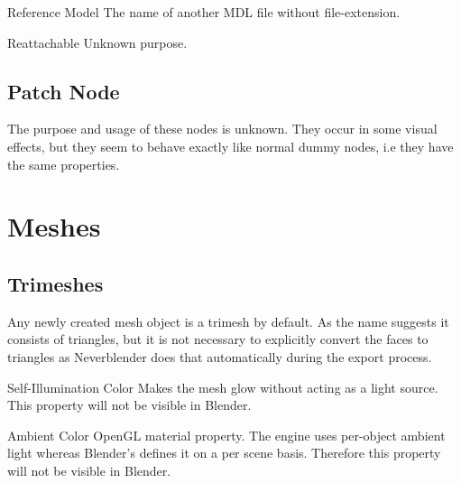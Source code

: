 \begin{propertyAurora}{Reference Model}
The name of another MDL file without file-extension.
\end{propertyAurora}

\begin{propertyAurora}{Reattachable}
Unknown purpose.
\end{propertyAurora}

\subsection{Patch Node}
The purpose and usage of these nodes is unknown. They occur in some visual effects, but
they seem to behave exactly like normal dummy nodes, i.e they have the same
properties.

\section{Meshes}

\subsection{Trimeshes}

\begin{minipage}[t]{0.65\textwidth}
    Any newly created mesh object is a trimesh by default. As the name 
    suggests it consists of triangles, but it is not necessary to explicitly 
    convert the faces to triangles as Neverblender does that automatically 
    during the export process.
\end{minipage}\hfill
\begin{minipage}[t]{0.3\textwidth}
    \centering{}
    \label{fig1}
\end{minipage}

\begin{propertyAurora}{Self-Illumination Color}
Makes the mesh glow without acting as a light source.
This property will not be visible in Blender.
\end{propertyAurora}

\begin{propertyAurora}{Ambient Color}
OpenGL material property. The engine uses per-object ambient light whereas Blender's 
defines it on a per scene basis. Therefore this property will not be visible in Blender.
\end{propertyAurora}

